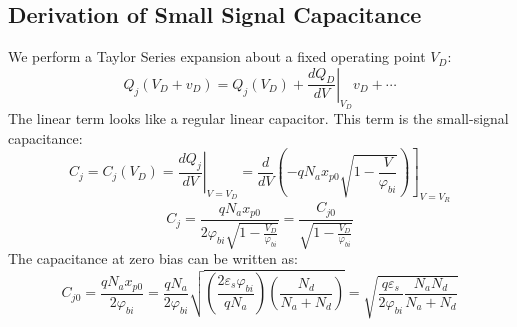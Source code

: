 \subsection{Derivation of Small Signal Capacitance}
We perform a Taylor Series expansion about a fixed operating point $V_D$:
    \begin{equation} 
        {Q_j}({V_D} + {v_D}) = {Q_j}({V_D}) + {\left. {\frac{{d{Q_D}}}{{dV}}} \right|_{{V_D}}}{v_D} +  \cdots 
    \end{equation}
The linear term looks like a regular linear capacitor.  This term is the small-signal capacitance:
    \begin{equation} 
        C_j^{} = {C_j}({V_D}) = {\left. {\frac{{dQ_j^{}}}{{dV}}} \right|_{V = {V_D}}} = {\left. {\frac{d}{{dV}}\left( { - q{N_a}{x_{p0}}\sqrt {1 - \frac{V}{{{\varphi _{bi}}}}} } \right)} \right]_{V = {V_R}}} 
    \end{equation}
    \begin{equation}
        {C_j} = \frac{{q{N_a}{x_{p0}}}}{{2{\varphi _{bi}}\sqrt {1 - \frac{{{V_D}}}{{{\varphi _{bi}}}}} }} = \frac{{C_{j0}^{}}}{{\sqrt {1 - \frac{{{V_D}}}{{{\varphi _{bi}}}}} }} 
    \end{equation}
The capacitance at zero bias can be written as:
    \begin{equation} 
        {C_{j0}} = \frac{{q{N_a}{x_{p0}}}}{{2{\varphi _{bi}}}} = \frac{{q{N_a}}}{{2{\varphi _{bi}}}}\sqrt {\left( {\frac{{2{\varepsilon _s}{\varphi _{bi}}}}{{q{N_a}}}} \right)\left( {\frac{{{N_d}}}{{{N_a} + {N_d}}}} \right)}  = \sqrt {\frac{{q{\varepsilon _s}}}{{2{\varphi _{bi}}}}\frac{{{N_a}{N_d}}}{{{N_a} + {N_d}}}}
        \label{eq:cj0}
    \end{equation} 

